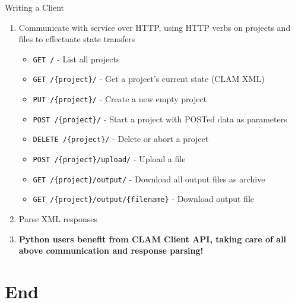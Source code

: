 \documentclass[compress]{beamer}
\begin{document}
\begin{frame}
    \begin{block}{Writing a Client}
        \begin{enumerate}
            \item Communicate with service over HTTP, using HTTP verbs on projects and files to effectuate state transfers 
            \begin{itemize}
                \item \texttt{GET /} - List all projects
                \item \texttt{GET /\{project\}/} - Get a project's current state (CLAM XML)
                \item \texttt{PUT /\{project\}/} - Create a new empty project
                \item \texttt{POST /\{project\}/} - Start a project with POSTed data as parameters
                \item \texttt{DELETE /\{project\}/} - Delete or abort a project
                \item \texttt{POST /\{project\}/upload/} - Upload a file
                \item \texttt{GET /\{project\}/output/} - Download all output files as archive
                \item \texttt{GET /\{project\}/output/\{filename\}} - Download output file
            \end{itemize}
            \item Parse XML responses
            \item \textbf{Python users benefit from CLAM Client API, taking care of all above communication and response parsing!}
        \end{enumerate}
    \end{block}

\end{frame}

\section{End}


\begin{frame}
    \raccoon
\end{frame}
\end{document}
